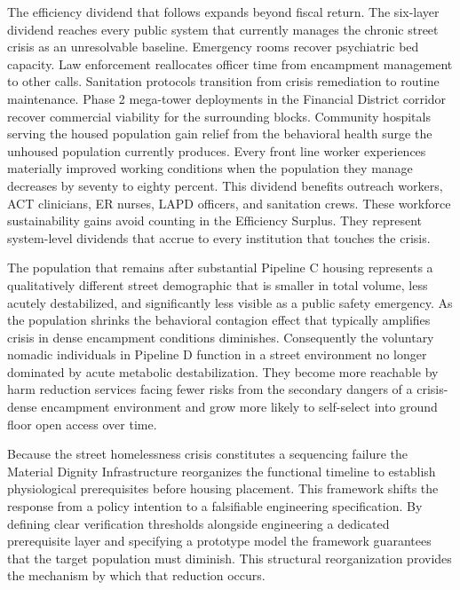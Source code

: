 \documentclass[12pt, letterpaper]{article}
\begin{document}
The efficiency dividend that follows expands beyond fiscal return. The six-layer dividend reaches every public system that currently manages the chronic street crisis as an unresolvable baseline. Emergency rooms recover psychiatric bed capacity. Law enforcement reallocates officer time from encampment management to other calls. Sanitation protocols transition from crisis remediation to routine maintenance. Phase 2 mega-tower deployments in the Financial District corridor recover commercial viability for the surrounding blocks. Community hospitals serving the housed population gain relief from the behavioral health surge the unhoused population currently produces. Every front line worker experiences materially improved working conditions when the population they manage decreases by seventy to eighty percent. This dividend benefits outreach workers, ACT clinicians, ER nurses, LAPD officers, and sanitation crews. These workforce sustainability gains avoid counting in the Efficiency Surplus. They represent system-level dividends that accrue to every institution that touches the crisis.

The population that remains after substantial Pipeline C housing represents a qualitatively different street demographic that is smaller in total volume, less acutely destabilized, and significantly less visible as a public safety emergency. As the population shrinks the behavioral contagion effect that typically amplifies crisis in dense encampment conditions diminishes. Consequently the voluntary nomadic individuals in Pipeline D function in a street environment no longer dominated by acute metabolic destabilization. They become more reachable by harm reduction services facing fewer risks from the secondary dangers of a crisis-dense encampment environment and grow more likely to self-select into ground floor open access over time.

Because the street homelessness crisis constitutes a sequencing failure the Material Dignity Infrastructure reorganizes the functional timeline to establish physiological prerequisites before housing placement. This framework shifts the response from a policy intention to a falsifiable engineering specification. By defining clear verification thresholds alongside engineering a dedicated prerequisite layer and specifying a prototype model the framework guarantees that the target population must diminish. This structural reorganization provides the mechanism by which that reduction occurs.

\clearpage
\raggedbottom
\appendix
{}
\let\oldparagraph\paragraph
\renewcommand{\paragraph}[1]{\needspace{3\baselineskip}\oldparagraph{#1}}
\let\paragraph\oldparagraph

\newpage
{}


\end{document}
